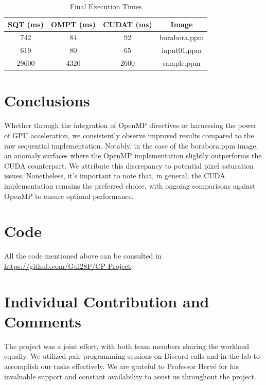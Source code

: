 \documentclass[sigconf]{acmart}
\begin{document}
\begin{table}[h!]
\centering
\begin{tabular}{|c|c|c|c|}
\hline
\textbf{SQT (ms)} & \textbf{OMPT (ms)} & \textbf{CUDAT (ms)} & \textbf{Image} \\
\hline
742 & 84 & 92 & borabora.ppm \\
\hline
619 & 80 & 65 & input01.ppm \\
\hline
29600 & 4320 & 2600 & sample.ppm \\
\hline
\end{tabular}
\vspace{0.2cm} %
\caption{Final Execution Times}
\label{table:staticanddynamic}
\end{table}
\section{Conclusions}
Whether through the integration of OpenMP directives or harnessing the power of GPU acceleration, we consistently observe improved results compared to the raw sequential implementation. Notably, in the case of the borabora.ppm image, an anomaly surfaces where the OpenMP implementation slightly outperforms the CUDA counterpart. We attribute this discrepancy to potential pixel saturation issues. Nonetheless, it's important to note that, in general, the CUDA implementation remains the preferred choice, with ongoing comparisons against OpenMP to ensure optimal performance.

\section{Code}
All the code mentioned above can be consulted in \url{https://github.com/Gui28F/CP-Project}.
\section{Individual Contribution and Comments}
The project was a joint effort, with both team members sharing the workload equally. We utilized pair programming sessions on Discord calls and in the lab to accomplish our tasks effectively. We are grateful to Professor Hervé for his invaluable support and constant availability to assist us throughout the project.


\end{document}
